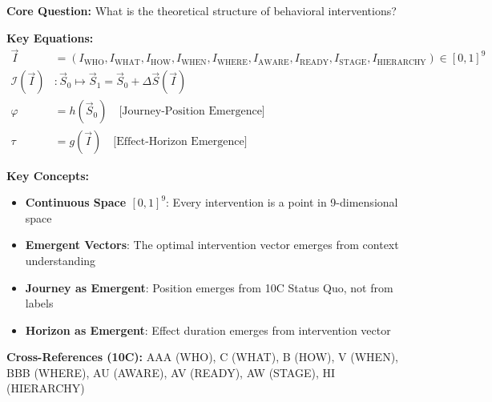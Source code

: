 \begin{tcolorbox}[colback=blue!5!white, colframe=blue!75!black,
    title=Quick Reference: Emergent Intervention Theory (EIT)]

\textbf{Core Question:} What is the theoretical structure of behavioral interventions?

\textbf{Key Equations:}
\begin{align}
\vec{I} &= (I_{\text{WHO}}, I_{\text{WHAT}}, I_{\text{HOW}}, I_{\text{WHEN}}, I_{\text{WHERE}}, I_{\text{AWARE}}, I_{\text{READY}}, I_{\text{STAGE}}, I_{\text{HIERARCHY}}) \in [0,1]^9 \tag{EIT-1} \\
\mathcal{I}(\vec{I}) &: \vec{S}_0 \mapsto \vec{S}_1 = \vec{S}_0 + \Delta\vec{S}(\vec{I}) \tag{EIT-2} \\
\varphi &= h(\vec{S}_0) \quad \text{[Journey-Position Emergence]} \tag{EIT-4} \\
\tau &= g(\vec{I}) \quad \text{[Effect-Horizon Emergence]} \tag{EIT-5}
\end{align}

\textbf{Key Concepts:}
\begin{itemize}[nosep]
\item \textbf{Continuous Space $[0,1]^9$}: Every intervention is a point in 9-dimensional space
\item \textbf{Emergent Vectors}: The optimal intervention vector emerges from context understanding
\item \textbf{Journey as Emergent}: Position emerges from 10C Status Quo, not from labels
\item \textbf{Horizon as Emergent}: Effect duration emerges from intervention vector
\end{itemize}

\textbf{Cross-References (10C):} AAA (WHO), C (WHAT), B (HOW), V (WHEN), BBB (WHERE), AU (AWARE), AV (READY), AW (STAGE), HI (HIERARCHY)
\end{tcolorbox}


